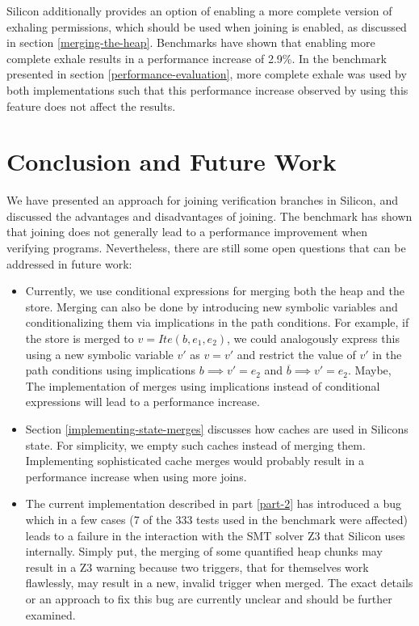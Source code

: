 \documentclass[11pt]{article}
\begin{document}
    Silicon additionally provides an option of enabling a more complete version
    of exhaling permissions, which should be used when joining is enabled,
    as discussed in section \ref{merging-the-heap}.
    Benchmarks have shown that enabling more complete 
    exhale results in a performance increase of 2.9\%. In the benchmark presented
    in section \ref{performance-evaluation}, more complete exhale was used
    by both implementations such that this performance increase observed by using this feature
    does not affect the results.


    \newpage
    \section{Conclusion and Future Work}

    We have presented an approach for joining verification branches
    in Silicon, and discussed the advantages and disadvantages of
    joining. The benchmark has shown that joining does not generally lead
    to a performance improvement when verifying programs.
    Nevertheless, there are still some open questions 
    that can be addressed in future work:

    \begin{itemize}
        \item Currently, we use conditional expressions for merging both
            the heap and the store. Merging can also be done by introducing
            new symbolic variables and conditionalizing them via implications
            in the path conditions. For example, if the store is merged to
            $v = Ite(b, e_1, e_2)$, we could analogously express this using
            a new symbolic variable $v'$ as
            $v = v'$ and restrict the value of $v'$ in the path conditions using implications
            $b \implies v' = e_2$ and $\overline{b} \implies v' = e_2$.
            Maybe, The implementation of merges using
            implications instead of conditional expressions
            will lead to a performance increase.
        \item Section \ref{implementing-state-merges} discusses how caches are
            used in Silicons state. For simplicity, we empty such caches
            instead of merging them. Implementing sophisticated cache merges would
            probably result in a performance increase when using more joins.
        \item The current implementation described in part \ref{part-2}
            has introduced a bug which in a few cases (7 of the 333
            tests used in the benchmark were affected) leads to a failure
            in the interaction with the SMT solver Z3 \cite{z3} that Silicon
            uses internally. Simply put, the merging of some quantified heap
            chunks may result in a Z3 warning because two triggers,
            that for themselves work flawlessly, may result in a new, invalid
            trigger when merged. The exact details or an approach to fix
            this bug are currently unclear and should be further examined.
    \end{itemize}

    \newpage
    \printbibliography

    
\end{document}
